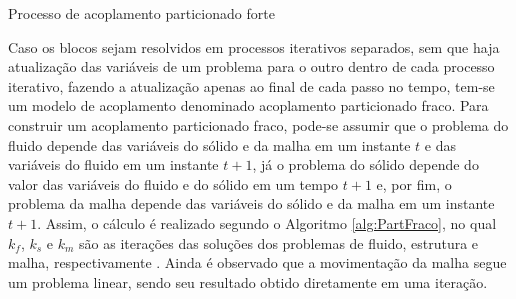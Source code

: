 \begin{algorithm}[h!]
    \caption{Processo de acoplamento particionado forte}
    \label{alg:acoplamentoForte}
\end{algorithm}

Caso os blocos sejam resolvidos em processos iterativos separados, sem que haja atualização das variáveis de um problema para o outro dentro de cada processo iterativo, fazendo a atualização apenas ao final de cada passo no tempo, tem-se um modelo de acoplamento denominado acoplamento particionado fraco. Para construir um acoplamento particionado fraco, pode-se assumir que o problema do fluido depende das variáveis do sólido e da malha em um instante $t$ e das variáveis do fluido em um instante $t+1$, já o problema do sólido depende do valor das variáveis do fluido e do sólido em um tempo $t+1$ e, por fim, o problema da malha depende das variáveis do sólido e da malha em um instante $t+1$. Assim, o cálculo é realizado segundo o Algoritmo \ref{alg:PartFraco}, no qual $k_f$, $k_s$ e $k_m$ são as iterações das soluções dos problemas de fluido, estrutura e malha, respectivamente \cite{sanches2022metodos}. Ainda é observado que a movimentação da malha segue um problema linear, sendo seu resultado obtido diretamente em uma iteração.

